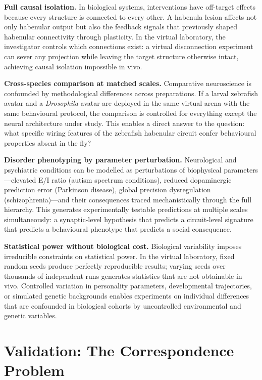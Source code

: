 \documentclass[12pt,a4paper]{article}
\begin{document}
\textbf{Full causal isolation.}
In biological systems, interventions have off-target effects because
every structure is connected to every other.
A habenula lesion affects not only habenular output but also the
feedback signals that previously shaped habenular connectivity through
plasticity.
In the virtual laboratory, the investigator controls which connections
exist: a virtual disconnection experiment can sever any projection
while leaving the target structure otherwise intact, achieving causal
isolation impossible in vivo.

\textbf{Cross-species comparison at matched scales.}
Comparative neuroscience is confounded by methodological differences
across preparations.
If a larval zebrafish avatar and a \textit{Drosophila} avatar are
deployed in the same virtual arena with the same behavioural protocol,
the comparison is controlled for everything except the neural
architecture under study.
This enables a direct answer to the question: what specific wiring
features of the zebrafish habenular circuit confer behavioural
properties absent in the fly?

\textbf{Disorder phenotyping by parameter perturbation.}
Neurological and psychiatric conditions can be modelled as
perturbations of biophysical parameters---elevated E/I ratio (autism
spectrum conditions), reduced dopaminergic prediction error (Parkinson
disease), global precision dysregulation (schizophrenia)---and their
consequences traced mechanistically through the full hierarchy.
This generates experimentally testable predictions at multiple
scales simultaneously: a synaptic-level hypothesis that predicts
a circuit-level signature that predicts a behavioural phenotype
that predicts a social consequence.

\textbf{Statistical power without biological cost.}
Biological variability imposes irreducible constraints on statistical
power.
In the virtual laboratory, fixed random seeds produce perfectly
reproducible results; varying seeds over thousands of independent runs
generates statistics that are not obtainable in vivo.
Controlled variation in personality parameters, developmental
trajectories, or simulated genetic backgrounds enables experiments on
individual differences that are confounded in biological cohorts by
uncontrolled environmental and genetic variables.


\section*{Validation: The Correspondence Problem}
\end{document}
